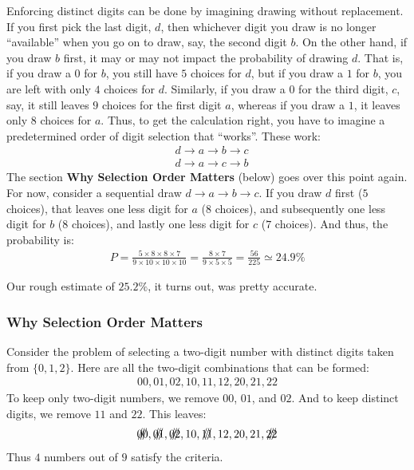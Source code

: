\documentclass[12pt]{article}
\begin{document}
Enforcing distinct digits can be done by imagining drawing without replacement. If you first pick the last digit, $d$, then whichever digit you draw is no longer ``available'' when you go on to draw, say, the second digit $b$. On the other hand, if you draw $b$ first, it may or may not impact the probability of drawing $d$. That is, if you draw a $0$ for $b$, you still have $5$ choices for $d$, but if you draw a $1$ for $b$, you are left with only $4$ choices for $d$. Similarly, if you draw a $0$ for the third digit, $c$, say, it still leaves $9$ choices for the first digit $a$, whereas if you draw a $1$, it leaves only $8$ choices for $a$. Thus, to get the calculation right, you have to imagine a predetermined order of digit selection that ``works''. These work:
\begin{align*}
& d \rightarrow a \rightarrow b \rightarrow c \\
& d \rightarrow a \rightarrow c \rightarrow b
\end{align*}
The section \textbf{Why Selection Order Matters} (below) goes over this point again. For now, consider a sequential draw $d \rightarrow a \rightarrow b \rightarrow c$. If you draw $d$ first ($5$ choices), that leaves one less digit for $a$ ($8$ choices), and subsequently one less digit for $b$ ($8$ choices), and lastly one less digit for $c$ ($7$ choices). And thus, the probability is:
\begin{align*}
P = \frac{5 \times 8 \times 8 \times 7}{9 \times 10 \times 10 \times 10} 
  = \frac{8 \times 7}{9 \times 5 \times 5} 
  = \frac{56}{225} 
  \simeq 24.9\%
\end{align*}

 Our rough estimate of $25.2\%$, it turns out, was pretty accurate. 


\subsubsection*{Why Selection Order Matters}
Consider the problem of selecting a two-digit number with distinct digits taken from $\{0,1,2\}$. Here are all the two-digit combinations that can be formed:
\begin{align*}
00, 01, 02, 10, 11, 12, 20, 21, 22
\end{align*}
To keep only two-digit numbers, we remove $00$, $01$, and $02$. And to keep distinct digits, we remove $11$ and $22$. This leaves: 
\begin{align*}
\crossout[3]{00}, \crossout[3]{01}, \crossout[3]{02}, 
10, \crossout[3]{11}, 12, 20, 21, \crossout[3]{22}
\end{align*}
Thus $4$ numbers out of $9$ satisfy the criteria. 
\end{document}
